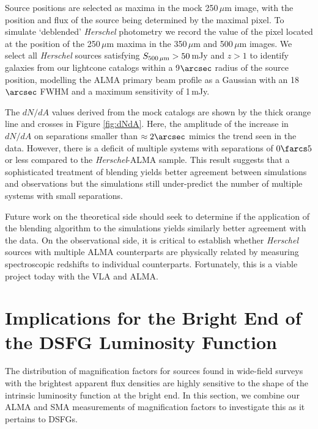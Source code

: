 \documentclass[iop]{emulateapj}
\begin{document}
Source positions are selected as maxima in the mock 250$\,\mu$m image, with the
position and flux of the source being determined by the maximal pixel.  To
simulate `deblended' \emph{Herschel} photometry we record the value of the
pixel located at the position of the 250$\,\mu$m maxima in the 350$\,\mu$m and
500$\,\mu$m images. We select all \emph{Herschel} sources satisfying
$S_{500\,\mu\rm{m}}>50\,$mJy and $z > 1$ to identify galaxies from our
lightcone catalogs within a 9$\arcsec$ radius of the source position, modelling
the ALMA primary beam profile as a Gaussian with an 18$\arcsec$ FWHM and a
maximum sensitivity of 1$\,$mJy.

The $dN/dA$ values derived from the \citet{Cowley:2015lr} mock catalogs are
shown by the thick orange line and crosses in Figure \ref{fig:dNdA}.  Here, the
amplitude of the increase in $dN/dA$ on separations smaller than $\approx
2\arcsec$ mimics the trend seen in the data.  However, there is a deficit of
multiple systems with separations of $0\farcs5$ or less compared to the {\it
Herschel}-ALMA sample.  This result suggests that a sophisticated treatment of
blending yields better agreement between simulations and observations but the
simulations still under-predict the number of multiple systems with small
separations.

Future work on the theoretical side should seek to determine if the application
of the \citet{Cowley:2015lr} blending algorithm to the \citet{HB13} simulations
yields similarly better agreement with the data.  On the observational side, it
is critical to establish whether {\it Herschel} sources with multiple ALMA
counterparts are physically related by measuring spectroscopic redshifts to
individual counterparts.  Fortunately, this is a viable project today with the
VLA and ALMA.

\section{Implications for the Bright End of the DSFG Luminosity
Function}\label{sec:discuss}

The distribution of magnification factors for sources found in wide-field
surveys with the brightest apparent flux densities are highly sensitive to the
shape of the intrinsic luminosity function at the bright end.  In this section,
we combine our ALMA and SMA measurements of magnification factors to investigate
this as it pertains to DSFGs.
\end{document}
